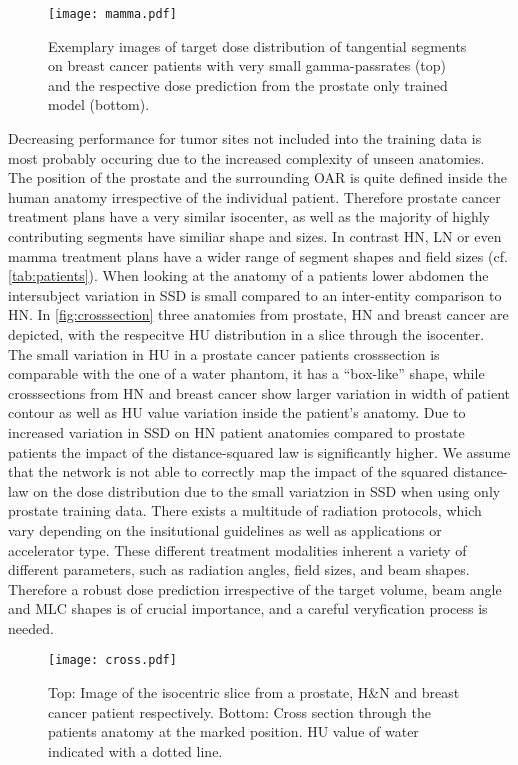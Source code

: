\begin{figure}
    \centering
    \texttt{[image: mamma.pdf]}
    \caption{
        Exemplary images of target dose distribution of tangential segments on breast cancer patients with very small gamma-passrates (top) and the respective dose prediction from the prostate only trained model (bottom).}\label{fig:mamma}
\end{figure}

Decreasing performance for tumor sites not included into the training data is most probably occuring due to the increased complexity of unseen anatomies. 
The position of the prostate and the surrounding \acs{OAR} is quite defined inside the human anatomy irrespective of the individual patient. 
Therefore prostate cancer treatment plans have a very similar isocenter, as well as the majority of highly contributing segments have similiar shape and sizes.
In contrast \acs{HN}, \acs{LN} or even mamma treatment plans have a wider range of segment shapes and field sizes (cf. \autoref{tab:patients}). 
When looking at the anatomy of a patients lower abdomen the intersubject variation in \acs{SSD} is small compared to an inter-entity comparison to \acs{HN}. 
In \autoref{fig:crosssection} three anatomies from prostate, \acs{HN} and breast cancer are depicted, with the respecitve \ac{HU} distribution in a slice through the isocenter.
The small variation in \acs{HU} in a prostate cancer patients crosssection is comparable with the one of a water phantom, it has a ``box-like'' shape, while crosssections from \acs{HN} and breast cancer show larger variation in width of patient contour as well as \acs{HU} value variation inside the patient's anatomy.
Due to increased variation in \acs{SSD} on \acs{HN} patient anatomies compared to prostate patients the impact of the distance-squared law is significantly higher.
We assume that the network is not able to correctly map the impact of the squared distance-law on the dose distribution due to the small variatzion in \acs{SSD} when using only prostate training data.
There exists a multitude of radiation protocols, which vary depending on the insitutional guidelines as well as applications or accelerator type. 
These different treatment modalities inherent a variety of different parameters, such as radiation angles, field sizes, and beam shapes.
Therefore a robust dose prediction irrespective of the target volume, beam angle and \acs{MLC} shapes is of crucial importance, and a careful veryfication process is needed. 

\begin{figure}
    \centering
    \texttt{[image: cross.pdf]}
    \caption{
        Top: Image of the isocentric slice from a prostate, H\&N and breast cancer patient respectively. 
        Bottom: Cross section through the patients anatomy at the marked position.
        HU value of water indicated with a dotted line.}\label{fig:crosssection}
\end{figure}

